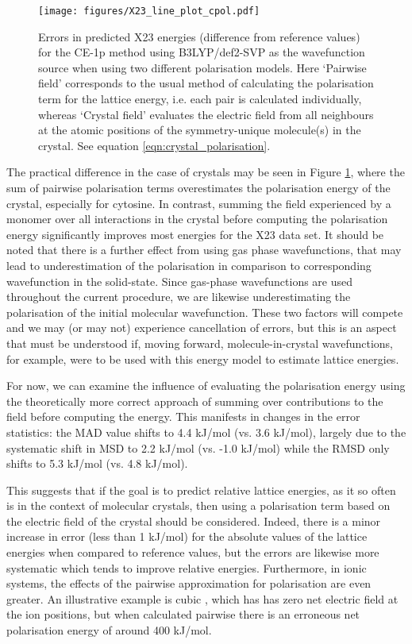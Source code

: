 \documentclass[preprint]{iucr}              %
\begin{document}
\begin{figure}
    \centering
    \texttt{[image: figures/X23\_line\_plot\_cpol.pdf]}
    \caption{Errors in predicted X23 energies (difference from reference values) for the CE-1p method using B3LYP/def2-SVP
    as the wavefunction source when using two different polarisation models. 
    Here `Pairwise field' corresponds to the usual method of calculating the polarisation
    term for the lattice energy, i.e. each pair is calculated individually, whereas `Crystal field' evaluates the electric
    field from all neighbours at the atomic positions of the symmetry-unique molecule(s) in the crystal. See equation \ref{eqn:crystal_polarisation}.}
    \label{fig:x23_cpol}
\end{figure}

The practical difference in the case of crystals may be seen in Figure \ref{fig:x23_cpol}, where the sum of pairwise polarisation terms
overestimates the polarisation energy of the crystal, especially for cytosine. In contrast, summing the field experienced by a monomer
over all interactions in the crystal before computing the polarisation energy significantly improves most energies for the X23 data set.
It should be noted that there is a further effect from using gas phase wavefunctions, that may lead to underestimation of the polarisation
in comparison to corresponding wavefunction in the solid-state.
Since gas-phase wavefunctions are used throughout the current procedure, 
we are likewise underestimating the polarisation of the initial molecular wavefunction. These two factors will compete and we may (or may not)
experience cancellation of errors, but this is an aspect that must be understood if, moving forward, molecule-in-crystal wavefunctions, for
example, were to be used with this energy model to estimate lattice energies. 

For now, we can examine the influence of evaluating the polarisation energy using the theoretically more correct approach of summing
over contributions to the field before computing the energy. This manifests in changes in the error statistics:
the MAD value shifts to 4.4 kJ/mol (vs. 3.6 kJ/mol), largely due to the systematic shift in MSD to 2.2 kJ/mol (vs. -1.0 kJ/mol) 
while the RMSD only shifts to 5.3 kJ/mol (vs. 4.8 kJ/mol). 


This suggests that if the goal is to predict relative lattice energies, as it so often is in the context of molecular crystals, then using a polarisation term based on the electric field of the crystal should be considered. 
Indeed, there is a minor increase in error (less than 1 kJ/mol) for the
absolute values of the lattice energies when compared to reference values, but the errors are 
likewise more systematic which tends to improve relative energies.
Furthermore, in ionic systems, the effects of the pairwise approximation for polarisation are even greater. An illustrative example is cubic , which has has zero net electric field at the ion positions, but when calculated pairwise there is an erroneous net polarisation energy of around 400 kJ/mol.  
\end{document}
